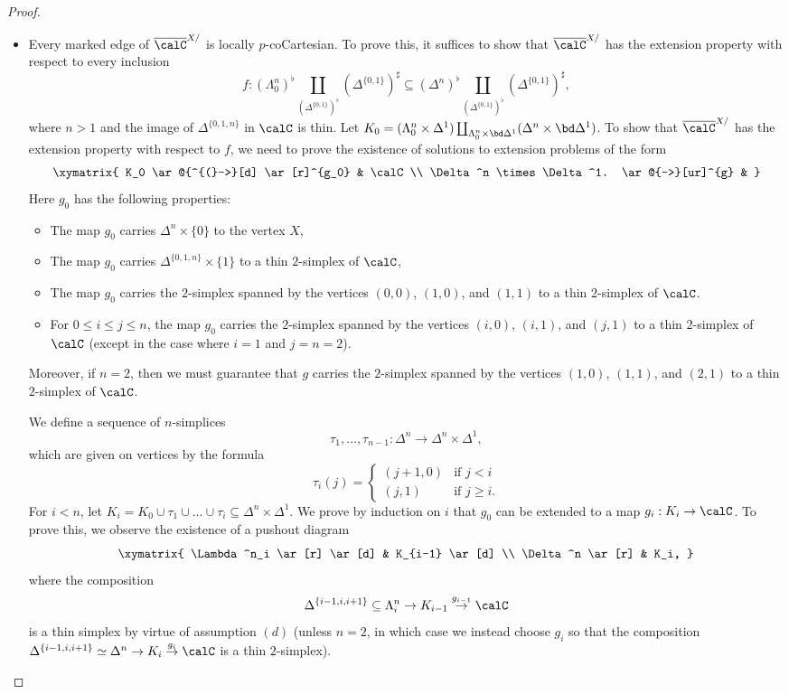 \begin{proof}
\begin{itemize}
\item[$(2)$] Every marked edge of $\overline{\calC}^{X/}$ is locally $p$-coCartesian.
To prove this, it suffices to show that $\overline{\calC}^{X/}$ has the extension property with
respect to every inclusion
$$ f: (\Lambda^n_0)^{\flat} \coprod_{ (\Delta^{ \{0,1\} })^{\flat} } ( \Delta^{ \{0,1\} })^{\sharp}
\subseteq ( \Delta^n )^{\flat} \coprod_{ ( \Delta^{ \{0,1\} })^{\flat} } ( \Delta^{ \{0,1\} })^{\sharp},$$
where $n > 1$ and the image of $\Delta^{ \{0,1, n\} }$ in $\calC$ is thin. Let 
$K_0 = ( \Lambda^n_0 \times \Delta^1) \coprod_{ 
\Lambda^n_0 \times \bd \Delta^1} ( \Delta^n \times \bd \Delta^1)$. To show that $\overline{\calC}^{X/}$ has the extension property with respect to $f$, we need to prove the existence of solutions to extension problems of the form
$$ \xymatrix{ K_0 \ar@{^{(}->}[d] \ar[r]^{g_0} & \calC \\
\Delta^n \times \Delta^1. \ar@{-->}[ur]^{g} & }$$
Here $g_0$ has the following properties:
\begin{itemize}
\item[$(a)$] The map $g_0$ carries $\Delta^n \times \{0\}$ to the vertex $X$,
\item[$(b)$] The map $g_0$ carries $\Delta^{ \{0,1,n\} } \times \{1\}$ to a thin $2$-simplex of $\calC$, 
\item[$(c)$] The map $g_0$ carries the $2$-simplex spanned by the vertices $(0,0)$, $(1,0)$, 
and $(1,1)$ to a thin $2$-simplex of $\calC$.
\item[$(d)$] For $0 \leq i \leq j \leq n$, the map $g_0$ carries the $2$-simplex spanned by the vertices
$(i,0)$, $(i,1)$, and $(j,1)$ to a thin $2$-simplex of $\calC$ (except in the case
where $i=1$ and $j=n=2$).
\end{itemize}
Moreover, if $n=2$, then we must guarantee that $g$ carries the $2$-simplex spanned by the vertices
$(1,0)$, $(1,1)$, and $(2,1)$ to a thin $2$-simplex of $\calC$.

We define a sequence of $n$-simplices
$$ \tau_1, \ldots, \tau_{n-1}: \Delta^n \rightarrow
\Delta^n \times \Delta^1,$$
which are given on vertices by the formula
$$ \tau_{i}(j) = \begin{cases} (j+1,0) & \text{if } j < i \\
(j,1) & \text{if } j \geq i. \end{cases}$$
For $i < n$, let $K_i = K_0 \cup \tau_1 \cup \ldots \cup \tau_i \subseteq \Delta^n \times \Delta^1$.
We prove by induction on $i$ that $g_0$ can be extended to a map $g_i: K_i \rightarrow \calC$.
To prove this, we observe the existence of a pushout diagram
$$ \xymatrix{ \Lambda^n_i \ar[r] \ar[d] & K_{i-1} \ar[d] \\
\Delta^n \ar[r] & K_i, }$$
where the composition
$$\Delta^{ \{i-1, i, i+1\} } \subseteq \Lambda^n_i \rightarrow K_{i-1} \stackrel{g_{i-1}}{\rightarrow} \calC$$ is a thin simplex by virtue of assumption $(d)$ (unless $n=2$, in which case we instead choose
$g_{i}$ so that the composition
$\Delta^{ \{i-1, i, i+1\} } \simeq \Delta^n \rightarrow K_i \stackrel{ g_i}{\rightarrow} \calC$ is a thin
$2$-simplex). 


\end{itemize}
\end{proof}
